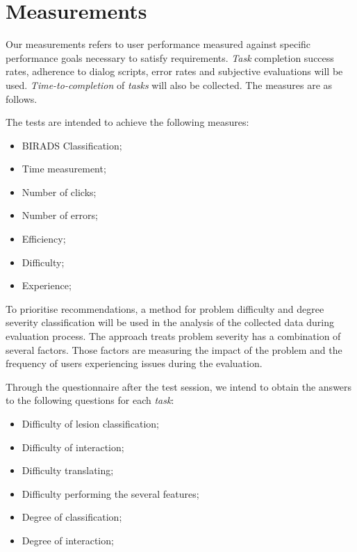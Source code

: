 \section{Measurements}

Our measurements refers to user performance measured against specific performance goals necessary to satisfy requirements. \textit{Task} completion success rates, adherence to dialog scripts, error rates and subjective evaluations will be used. \textit{Time-to-completion} of \textit{tasks} will also be collected. The measures are as follows.

\hfill


The tests are intended to achieve the following measures:


\hfill

\begin{itemize}
\item BIRADS Classification;
\item Time measurement;
\item Number of clicks;
\item Number of errors;
\item Efficiency;
\item Difficulty;
\item Experience;
\end{itemize}

\hfill


To prioritise recommendations, a method for problem difficulty and degree severity classification will be used in the analysis of the collected data during evaluation process. The approach treats problem severity has a combination of several factors. Those factors are measuring the impact of the problem and the frequency of users experiencing issues during the evaluation.

\hfill


Through the questionnaire after the test session, we intend to obtain the answers to the following questions for each \textit{task}:


\hfill

\begin{itemize}
\item Difficulty of lesion classification;
\item Difficulty of interaction;
\item Difficulty translating;
\item Difficulty performing the several features;
\item Degree of classification;
\item Degree of interaction;
\end{itemize}

\hfill

